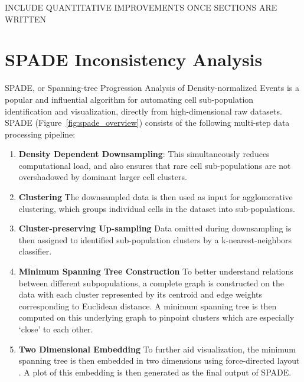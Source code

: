 \documentclass{article}
\begin{document}
 INCLUDE QUANTITATIVE IMPROVEMENTS ONCE SECTIONS ARE WRITTEN

\section{SPADE Inconsistency Analysis}
\label{sec:spade}
SPADE, or Spanning-tree Progression Analysis of Density-normalized Events \cite{} is a popular and influential algorithm for automating cell sub-population identification and visualization, directly from high-dimensional raw datasets. SPADE  (Figure~\ref{fig:spade_overview}) consists of the following multi-step data processing pipeline:

\begin{enumerate}
\item \textbf{Density Dependent Downsampling}: This simultaneously reduces computational load, and also ensures that rare cell sub-populations are not overshadowed by dominant larger cell clusters. 

\item \textbf{Clustering} The downsampled data is then used as input for agglomerative clustering, which groups individual cells in the dataset into sub-populations. 

\item \textbf{Cluster-preserving Up-sampling} Data omitted during downsampling is then assigned to identified sub-population clusters by a k-nearest-neighbors classifier.

\item \textbf{Minimum Spanning Tree Construction} To better understand relations between different subpopulations, a complete graph is constructed on the data with each cluster represented by its centroid and edge weights corresponding to Euclidean distance.  A minimum spanning tree is then computed on this underlying graph to pinpoint clusters which are especially ‘close’ to each other.
 
\item \textbf{Two Dimensional Embedding} To further aid visualization, the minimum spanning tree is then embedded in two dimensions using force-directed layout \cite{}. A plot of this embedding is then generated as the final output of SPADE.
\end{enumerate}
\end{document}

